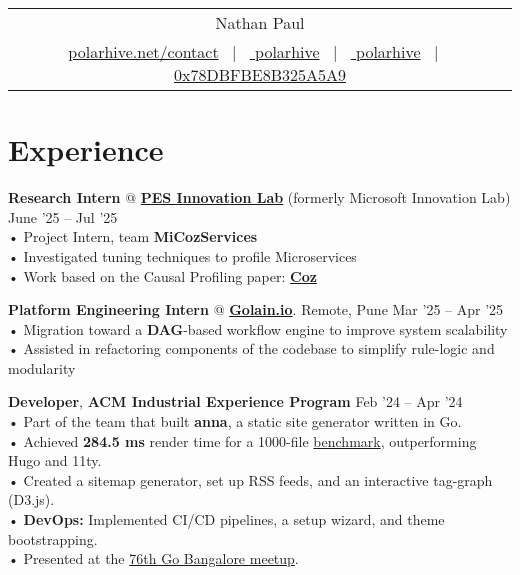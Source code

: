 \documentclass[a4,12pt]{article}
\begin{document}
\begin{tabularx}{\linewidth}{@{}C@{}}
\Huge{Nathan Paul} \\[10pt]
\href{https://polarhive.net}{ polarhive.net/contact} \ $|$ \
\href{https://github.com/polarhive}{ polarhive} \ $|$ \
\href{https://linkedin.com/in/polarhive}{ polarhive} \ $|$ \
\href{https://polarhive.net/email}{ 0x78DBFBE8B325A5A9}
\end{tabularx}

\section{Experience}

\textbf{Research Intern} @ \textbf{\href{https://theinnovationlab.in}{PES Innovation Lab}} (formerly Microsoft Innovation Lab) \hfill June '25 – Jul '25 \\
• Project Intern, team \textbf{MiCozServices} \\
• Investigated tuning techniques to profile Microservices \\
• Work based on the Causal Profiling paper: \textbf{\href{https://dl.acm.org/doi/10.1145/2815400.2815409}{Coz}}

\textbf{Platform Engineering Intern} @ \textbf{\href{https://golain.io}{Golain.io}}. Remote, Pune \hfill Mar '25 – Apr '25 \\
• Migration toward a \textbf{DAG}-based workflow engine to improve system scalability \\
• Assisted in refactoring components of the codebase to simplify rule-logic and modularity

\textbf{Developer}, \textbf{ACM Industrial Experience Program} \hfill Feb '24 – Apr '24 \\
• Part of the team that built \textbf{anna}, a static site generator written in Go. \\
• Achieved \textbf{284.5 ms} render time for a 1000-file \href{https://github.com/anna-ssg/anna/actions}{benchmark}, outperforming Hugo and 11ty. \\
• Created a sitemap generator, set up RSS feeds, and an interactive tag-graph (D3.js). \\
• \textbf{DevOps:} Implemented CI/CD pipelines, a setup wizard, and theme bootstrapping. \\
• Presented at the \href{https://www.meetup.com/golang-bangalore/events/301697429/}{76th Go Bangalore meetup}.
\end{document}
